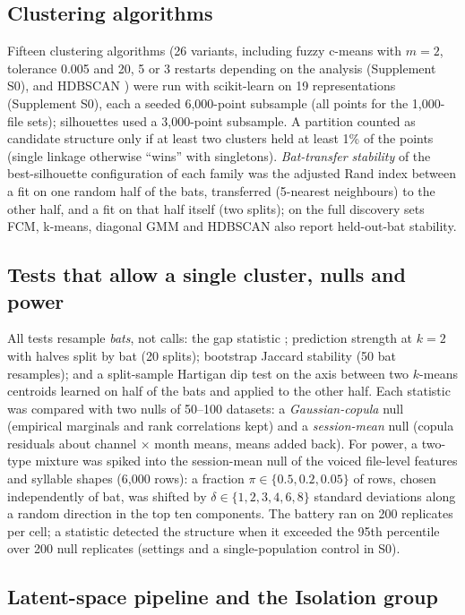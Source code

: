 \subsection{Clustering algorithms}
Fifteen clustering algorithms (26 variants, including fuzzy c-means with $m=2$, tolerance 0.005 and 20, 5 or 3 restarts depending on the analysis (Supplement S0), and HDBSCAN \cite{campello2013}) were run with scikit-learn \cite{pedregosa2011} on 19 representations (Supplement S0), each a seeded 6,000-point subsample (all points for the 1,000-file sets); silhouettes used a 3,000-point subsample. A partition counted as candidate structure only if at least two clusters held at least 1\% of the points (single linkage otherwise ``wins'' with singletons). \emph{Bat-transfer stability} of the best-silhouette configuration of each family was the adjusted Rand index \cite{hubert1985} between a fit on one random half of the bats, transferred (5-nearest neighbours) to the other half, and a fit on that half itself (two splits); on the full discovery sets FCM, k-means, diagonal GMM and HDBSCAN also report held-out-bat stability.

\subsection{Tests that allow a single cluster, nulls and power}
All tests resample \emph{bats}, not calls: the gap statistic \cite{tibshirani2001}; prediction strength \cite{tibshirani2005} at $k=2$ with halves split by bat (20 splits); bootstrap Jaccard stability \cite{hennig2007} (50 bat resamples); and a split-sample Hartigan dip test \cite{hartigan1985} on the axis between two $k$-means centroids learned on half of the bats and applied to the other half. Each statistic was compared with two nulls of 50--100 datasets: a \emph{Gaussian-copula} null (empirical marginals and rank correlations kept) and a \emph{session-mean} null (copula residuals about channel $\times$ month means, means added back). For power, a two-type mixture was spiked into the session-mean null of the voiced file-level features and syllable shapes (6,000 rows): a fraction $\pi\in\{0.5,0.2,0.05\}$ of rows, chosen independently of bat, was shifted by $\delta\in\{1,2,3,4,6,8\}$ standard deviations along a random direction in the top ten components. The battery ran on 200 replicates per cell; a statistic detected the structure when it exceeded the 95th percentile over 200 null replicates (settings and a single-population control in S0).

\subsection{Latent-space pipeline and the Isolation group}

